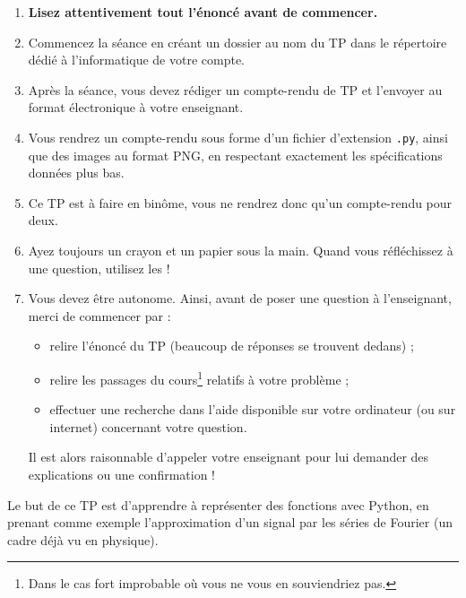 
\begin{enumerate}
\item  \textbf{Lisez attentivement  tout l'énoncé
    avant de commencer.}
\item Commencez la séance en créant un dossier au nom du TP dans le répertoire dédié à l'informatique de votre compte. 
\item Après la séance, vous devez rédiger un compte-rendu de TP et
l'envoyer au format électronique à votre enseignant.
\item Vous rendrez un compte-rendu sous forme d'un fichier d'extension \texttt{.py}, ainsi que des images au format PNG, en respectant exactement les spécifications données plus bas. 
\item Ce TP est à faire en binôme, vous ne rendrez donc qu'un  compte-rendu pour deux.
\item Ayez toujours un crayon et un papier sous la main. Quand vous réfléchissez à une question, utilisez les !
\item Vous devez être autonome. Ainsi, avant de poser une question à l'enseignant, merci de commencer par :
\begin{itemize}
  \item relire l'énoncé du TP (beaucoup de réponses se trouvent dedans) ;
  \item relire les passages du cours\footnote{Dans le cas fort 
improbable où vous ne vous en souviendriez pas.} relatifs à votre problème ;
  \item effectuer une recherche dans l'aide disponible sur votre ordinateur (ou sur internet) concernant votre question.
\end{itemize}
  Il est alors raisonnable d'appeler votre enseignant pour lui demander des explications ou une confirmation !
\end{enumerate}

Le but de ce TP est d'apprendre à représenter des fonctions avec Python, en prenant comme exemple l'approximation d'un signal par les séries de Fourier (un cadre déjà vu en physique).

